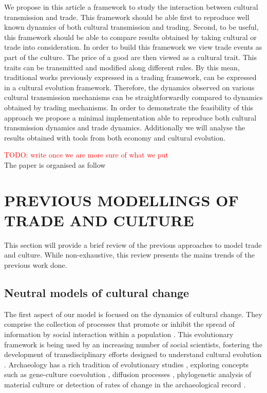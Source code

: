 \documentclass{wscpaperproc}
\newcommand{\memo}[2]{\textcolor{#1}{#2}}
\newcommand{\todo}[1]{\memo{red}{TODO: #1\\}}
\begin{document}
We propose in this article a framework to study the interaction between cultural transmission and trade. This framework should be able first to reproduce well known dynamics of both cultural transmission and trading. Second, to be useful, this framework should be able to compare results obtained by taking cultural or trade into consideration. In order to build this framework we view trade events as part of the culture. The price of a good are then viewed as a cultural trait. This traits can be transmitted and modified along different rules. By this mean, traditional works previously expressed in a trading framework, can be expressed in a cultural evolution framework. Therefore, the dynamics observed on various cultural transmission mechanisms can be straightforwardly compared to dynamics obtained by trading mechanisms. In order to demonstrate the feasibility of this approach we propose a minimal implementation able to reproduce both cultural transmission dynamics and trade dynamics. Additionally we will analyse the results obtained with tools from both economy and cultural evolution.




\todo{write once we are more sure of what we put}
The paper is organised as follow

\section{PREVIOUS MODELLINGS OF TRADE AND CULTURE}

This section will provide a brief review of the previous approaches to model trade and culture. While non-exhaustive, this review presents the mains trends of the previous work done.

\subsection{Neutral models of cultural change}

The first aspect of our model is focused on the dynamics of cultural change. They comprise the collection of processes that promote or inhibit the spread of information by social interaction within a population \cite[3]{boyd_origin_2005}. This evolutionary framework is being used by an increasing number of social scientists, fostering the development of transdisciplinary efforts designed to understand cultural evolution \cite{henrich_evolution_2003}. Archaeology has a rich tradition of evolutionary studies \cite{lycett_cultural_2015}, exploring concepts such as gene-culture coevolution \cite{burger_absence_2007}, diffusion processes \cite{fort_synthesis_2012}, phylogenetic analysis of material culture \cite{obrien_cladistics_2001} or detection of rates of change in the archaeological record \cite{premo_cultural_2014}.
\end{document}
